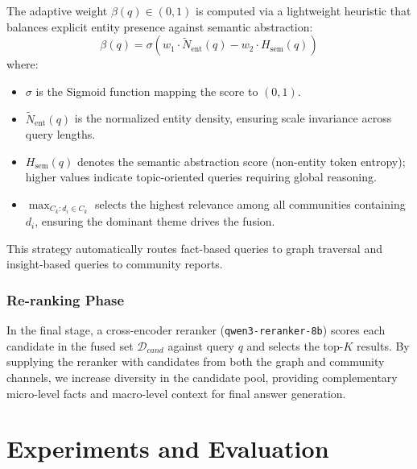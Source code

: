 \documentclass[11pt]{article}
\begin{document}
The adaptive weight $\beta(q) \in (0, 1)$ is computed via a lightweight heuristic that balances explicit entity presence against semantic abstraction:
\begin{equation}
    \beta(q) = \sigma \left( w_1 \cdot \tilde{N}_{\text{ent}}(q) - w_2 \cdot H_{\text{sem}}(q) \right)
    \label{eq:beta_calc}
\end{equation}
\noindent where:
\begin{itemize}
    \item $\sigma$ is the Sigmoid function mapping the score to $(0, 1)$.
    \item $\tilde{N}_{\text{ent}}(q)$ is the normalized entity density, ensuring scale invariance across query lengths.
    \item $H_{\text{sem}}(q)$ denotes the semantic abstraction score (non-entity token entropy); higher values indicate topic-oriented queries requiring global reasoning.
    \item $\max_{C_k: d_i \in C_k}$ selects the highest relevance among all communities containing $d_i$, ensuring the dominant theme drives the fusion.
\end{itemize}
This strategy automatically routes fact-based queries to graph traversal and insight-based queries to community reports.

\subsubsection{Re-ranking Phase}
In the final stage, a cross-encoder reranker (\texttt{qwen3-reranker-8b}) scores each candidate in the fused set $\mathcal{D}_{cand}$ against query $q$ and selects the top-$K$ results. By supplying the reranker with candidates from both the graph and community channels, we increase diversity in the candidate pool, providing complementary micro-level facts and macro-level context for final answer generation. 

\section{Experiments and Evaluation}

\end{document}
